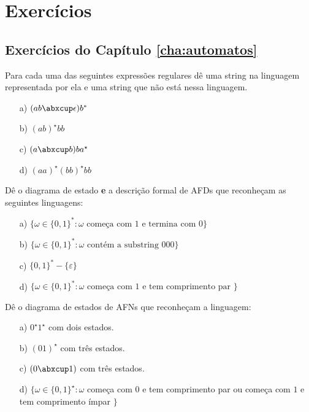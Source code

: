 \chapter{Exercícios}
\label{cha:exercicios}


\section{Exercícios do Capítulo \ref{cha:automatos}}
\label{sec:ex-automatos}

\begin{exercicio}
  Para cada uma das seguintes expressões regulares dê uma string na linguagem representada por ela e uma string que não está nessa linguagem.

\begin{itemize}
\item[a)] $(ab \abxcup \epsilon)b^*$
\item[b)] $(ab)^\star bb$
\item[c)] $(a \abxcup b)ba^\star$
\item[d)] $(aa)^\star(bb)^\star bb$
\end{itemize}

\end{exercicio}


\begin{exercicio}
  Dê o diagrama de estado {\bf e} a descrição formal de AFDs que reconheçam as seguintes linguagens:

\begin{itemize}
\item[a)] $\{\omega \in \{0,1\}^* : \omega \textrm{ começa com } 1 \textrm{ e termina com } 0\}$
\item[b)] $\{\omega \in \{0,1\}^* : \omega \textrm{ contém a substring } 000 \}$
\item[c)] $\{0,1\}^* - \{\varepsilon\}$
\item[d)] $\{\omega \in \{0,1\}^* : \omega \textrm{ começa com } 1 \textrm{ e tem comprimento par }\}$
\end{itemize}

\end{exercicio}


\begin{exercicio}
  Dê o diagrama de estados de AFNs que reconheçam a linguagem:
\begin{itemize}
\item[a)] $0^\star 1^\star$ com dois estados.
\item[b)] $(01)^\star$ com três estados.
\item[c)] $(0 \abxcup 1)$ com três estados.
\item[d)] $\{\omega \in \{0,1\}^\star : \omega$ começa com $0$ e tem comprimento par ou começa com $1$ e tem comprimento ímpar $\}$
\end{itemize}
\end{exercicio}


